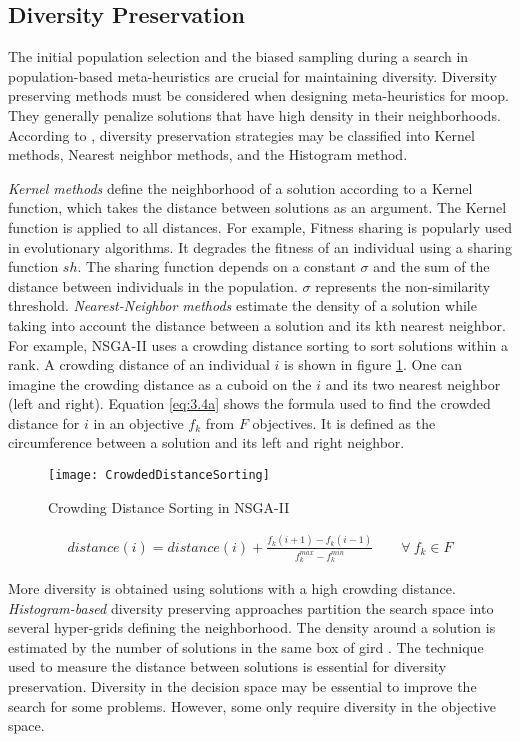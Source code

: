 \subsection{Diversity Preservation}\label{sec:diversitypreservation}
The initial population selection and the biased sampling during a search in population-based meta-heuristics are crucial for maintaining diversity. Diversity preserving methods must be considered when designing meta-heuristics for \gls{moop}. They generally penalize solutions that have high density in their neighborhoods. According to \parencite{Emmerich2018AMethods}, diversity preservation strategies may be classified into Kernel methods, Nearest neighbor methods, and the Histogram method.

\textit{Kernel methods} define the neighborhood of a solution according to a Kernel function, which takes the distance between solutions as an argument. The Kernel function is applied to all distances. For example, Fitness sharing is popularly used in evolutionary algorithms. It degrades the fitness of an individual using a sharing function $sh$. The sharing function depends on a constant $\sigma$ and the sum of the distance between individuals in the population.  $\sigma$ represents the non-similarity threshold.  \textit{Nearest-Neighbor methods} estimate the density of a solution while taking into account the distance between a solution and its kth nearest neighbor. For example, NSGA-II uses a crowding distance sorting to sort solutions within a rank. A crowding distance of an individual $i$ is shown in figure \ref{fig:crowdeddistance_sorting}. One can imagine the crowding distance as a cuboid on the $i$ and its two nearest neighbor (left and right). Equation \ref{eq:3.4a} shows the formula used to find the crowded distance for $i$ in an objective $f_k$ from $F$ objectives. It is defined as the circumference between a solution and its left and right neighbor. 

\begin{figure}
    \centering
    \texttt{[image: CrowdedDistanceSorting]}
    \caption{Crowding Distance Sorting in NSGA-II}
    \label{fig:crowdeddistance_sorting}
\end{figure}

\begin{align}
    distance(i) = distance(i) + \frac{f_k(i+1) - f_k(i-1)}{f_k^{max} - f_k^{min}} \qquad \forall \ f_k \in F \label{eq:3.4a} 
\end{align}

More diversity is obtained using solutions with a high crowding distance. \textit{Histogram-based} diversity preserving approaches partition the search space into several hyper-grids defining the neighborhood. The density around a solution is estimated by the number of solutions in the same box of gird \parencite{Talbi2009Metaheuristics:Implementation}. The technique used to measure the distance between solutions is essential for diversity preservation. Diversity in the decision space may be essential to improve the search for some problems. However, some only require diversity in the objective space.

